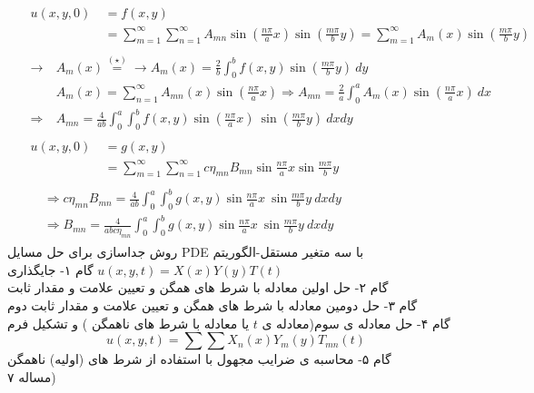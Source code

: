 \begin{equation*}
	\begin{aligned}
	{} &\
	\begin{aligned}
		u(x,y,0) {} &\
		=f(x,y)
		\\ &\
		=\sum_{m=1}^{\infty}\sum_{n=1}^{\infty}A_{mn}  \sin \left(\frac{n \pi}{a}x\right) \sin\left( \frac{m \pi}{b}y\right)=\sum_{m=1}^{\infty}A_{m} (x)\sin \left(\frac{m \pi}{b}y\right)
	\end{aligned}
\\ &\
\begin{aligned}
	\rightarrow {} &\
	A_{m}(x)\overset{(\star)}{=}\rightarrow A_{m}(x)=\frac{2}{b}\int_{0}^{b}  f(x,y) \sin \left(\frac{m \pi }{b}y\right) \ dy
	\\ &\
	A_{m}(x)=\sum_{n=1}^{\infty} A_{mn}(x) \sin \left(\frac{n \pi }{a}x\right) \Rightarrow A_{mn}=\frac{2}{a}\int_{0}^{a} A_{m}(x) \sin \left(\frac{n \pi }{a}x\right) \ dx
	\\ \Rightarrow &\
	A_{mn}=\frac{4}{ab}\int_{0}^{a}\int_{0}^{b}  f(x,y)\sin \left(\frac{n \pi }{a}x\right)\ \sin \left(\frac{m \pi }{b}y\right) \ dx dy
\end{aligned}
\\ &\
\begin{aligned}
	{} 
	u(x,y,0) &\ =g(x,y) \\&\ =\sum_{m=1}^{\infty}\sum_{n=1}^{\infty}c \eta_{mn}B_{mn}  \sin \frac{n \pi}{a}x \sin \frac{m \pi}{b}y
\end{aligned}
\\ &\
\begin{aligned}
	{} &\
	\Rightarrow c \eta_{mn}B_{mn}=\frac{4}{ab}\int_{0}^{a}\int_{0}^{b}  g(x,y)\sin \frac{n \pi }{a}x \ \sin \frac{m \pi }{b}y \ dx dy
	\\ &\
	\Rightarrow B_{mn}=\frac{4}{abc \eta_{mn}}\int_{0}^{a}\int_{0}^{b}  g(x,y)\sin \frac{n \pi }{a}x \ \sin \frac{m \pi }{b}y \ dx dy
\end{aligned}
\end{aligned}
\end{equation*}
روش جداسازی برای حل مسایل PDE با سه متغیر مستقل-الگوریتم\\
گام ۱- جایگذاری 
$u(x,y,t)=X(x)Y(y)T(t)$\\
گام ۲- حل اولین معادله با شرط های همگن و تعیین علامت و مقدار ثابت\\
گام ۳- حل دومین معادله با شرط های همگن و تعیین علامت و مقدار ثابت دوم \\
گام ۴- حل معادله ی سوم(معادله ی
$t$
یا معادله با شرط های ناهمگن
)
و تشکیل فرم
\[u(x,y,t)=\sum\sum {X_n(x)Y_m(y)T_{mn}(t)}\]
گام ۵- محاسبه ی ضرایب مجهول با استفاده از شرط های (اولیه) ناهمگن\\
مساله ۷)\\
